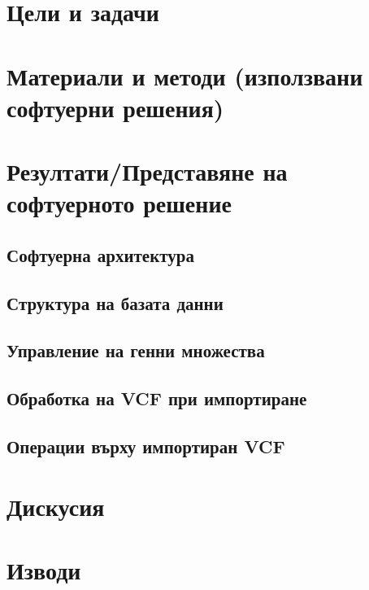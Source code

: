 \documentclass[pdftex,cyrillic,14pt,a4page,twoside]{extreport}
\begin{document}
\chapter{Цели и задачи}
\chapter{Материали и методи (използвани софтуерни решения)}
\chapter{Резултати/Представяне на\\ софтуерното решение}
\section{Софтуерна архитектура}
\section{Структура на базата данни}
\section{Управление на генни множества}
\section{Обработка на VCF при импортиране}
\section{Операции върху импортиран VCF}
\chapter{Дискусия}
\chapter{Изводи}




\end{document}

